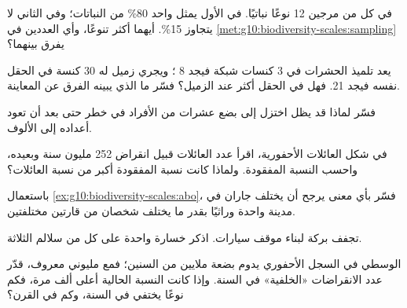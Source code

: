 \begin{exercise}[$\star\star$]\label{exo:g10:biodiversity-scales:6}
في كل من مرجين 12 نوعًا نباتيًا. في الأول يمثل  واحد 80\%
من النباتات؛ وفي الثاني لا يتجاوز  15\%. أيهما أكثر تنوعًا، وأي
العددين في \cref{met:g10:biodiversity-scales:sampling} يفرق بينهما؟
\end{exercise}

\begin{exercise}[$\star\star$]\label{exo:g10:biodiversity-scales:7}
يعد تلميذ الحشرات في 3 كنسات شبكة فيجد 8 ؛ ويجري زميل له 30 كنسة
في الحقل نفسه فيجد 21. فهل في الحقل  أكثر عند الزميل؟ فسّر ما
الذي يبينه الفرق عن المعاينة.
\end{exercise}

\begin{exercise}[$\star\star$]\label{exo:g10:biodiversity-scales:8}
فسّر لماذا قد يظل  اختزل إلى بضع عشرات من الأفراد في خطر حتى بعد
أن تعود أعداده إلى الألوف.
\end{exercise}

\begin{exercise}[$\star\star$]\label{exo:g10:biodiversity-scales:9}
في شكل العائلات الأحفورية، اقرأ عدد العائلات قبيل انقراض 252 مليون
سنة وبعيده، واحسب النسبة المفقودة. ولماذا كانت نسبة \emph{}
المفقودة أكبر من نسبة العائلات؟
\end{exercise}

\begin{exercise}[$\star\star$]\label{exo:g10:biodiversity-scales:10}
باستعمال \cref{ex:g10:biodiversity-scales:abo}، فسّر بأي معنى يرجح أن
يختلف جاران في مدينة واحدة وراثيًا بقدر ما يختلف شخصان من قارتين
مختلفتين.
\end{exercise}

\begin{exercise}[$\star\star$]\label{exo:g10:biodiversity-scales:11}
تجفف بركة لبناء موقف سيارات. اذكر خسارة واحدة على كل من سلالم  الثلاثة.
\end{exercise}

\begin{exercise}[$\star\star\star$]\label{exo:g10:biodiversity-scales:12}
 الوسطي في السجل الأحفوري يدوم بضعة ملايين من السنين؛ فمع مليوني
 معروف، قدّر عدد الانقراضات «الخلفية» في السنة. وإذا كانت النسبة
الحالية أعلى ألف مرة، فكم نوعًا يختفي في السنة، وكم في القرن؟
\end{exercise}

